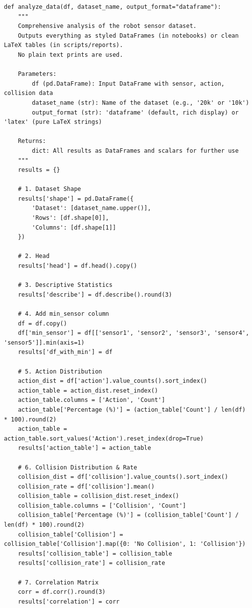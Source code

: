 \begin{verbatim}
def analyze_data(df, dataset_name, output_format="dataframe"):
    """
    Comprehensive analysis of the robot sensor dataset.
    Outputs everything as styled DataFrames (in notebooks) or clean LaTeX tables (in scripts/reports).
    No plain text prints are used.
    
    Parameters:
        df (pd.DataFrame): Input DataFrame with sensor, action, collision data
        dataset_name (str): Name of the dataset (e.g., '20k' or '10k')
        output_format (str): 'dataframe' (default, rich display) or 'latex' (pure LaTeX strings)
    
    Returns:
        dict: All results as DataFrames and scalars for further use
    """
    results = {}
    
    # 1. Dataset Shape
    results['shape'] = pd.DataFrame({
        'Dataset': [dataset_name.upper()],
        'Rows': [df.shape[0]],
        'Columns': [df.shape[1]]
    })
    
    # 2. Head
    results['head'] = df.head().copy()
    
    # 3. Descriptive Statistics
    results['describe'] = df.describe().round(3)
    
    # 4. Add min_sensor column
    df = df.copy()
    df['min_sensor'] = df[['sensor1', 'sensor2', 'sensor3', 'sensor4', 'sensor5']].min(axis=1)
    results['df_with_min'] = df
    
    # 5. Action Distribution
    action_dist = df['action'].value_counts().sort_index()
    action_table = action_dist.reset_index()
    action_table.columns = ['Action', 'Count']
    action_table['Percentage (%)'] = (action_table['Count'] / len(df) * 100).round(2)
    action_table = action_table.sort_values('Action').reset_index(drop=True)
    results['action_table'] = action_table
    
    # 6. Collision Distribution & Rate
    collision_dist = df['collision'].value_counts().sort_index()
    collision_rate = df['collision'].mean()
    collision_table = collision_dist.reset_index()
    collision_table.columns = ['Collision', 'Count']
    collision_table['Percentage (%)'] = (collision_table['Count'] / len(df) * 100).round(2)
    collision_table['Collision'] = collision_table['Collision'].map({0: 'No Collision', 1: 'Collision'})
    results['collision_table'] = collision_table
    results['collision_rate'] = collision_rate
    
    # 7. Correlation Matrix
    corr = df.corr().round(3)
    results['correlation'] = corr
    

\end{verbatim}
